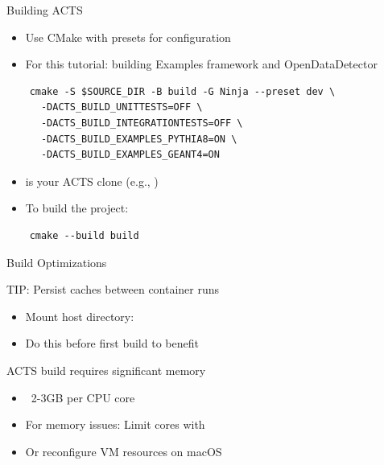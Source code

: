 \documentclass[lualatex,aspectratio=169,t,13pt,dvipsnames]{beamer}
\begin{document}
\begin{frame}[fragile]{Building ACTS}
  \begin{itemize}
    \item Use CMake with presets for configuration
    \item For this tutorial: building Examples framework and OpenDataDetector
  \end{itemize}
  
  \begin{verbatim}
    cmake -S $SOURCE_DIR -B build -G Ninja --preset dev \
      -DACTS_BUILD_UNITTESTS=OFF \
      -DACTS_BUILD_INTEGRATIONTESTS=OFF \
      -DACTS_BUILD_EXAMPLES_PYTHIA8=ON \
      -DACTS_BUILD_EXAMPLES_GEANT4=ON
  \end{verbatim}
  
  \begin{itemize}
    \item \cc{\$SOURCE\_DIR} is your ACTS clone (e.g., )
    \item To build the project:
  \end{itemize}
  
  \begin{verbatim}
    cmake --build build
  \end{verbatim}
\end{frame}

\begin{frame}{Build Optimizations}
  \begin{successblock}{ TIP: Persist  caches between container runs}
    \begin{itemize}
      \item Mount host directory: 
      \item Do this before first build to benefit
    \end{itemize}
  \end{successblock}
  \begin{warnblock}{\emoji{warning} ACTS build requires significant memory}
    \begin{itemize}
      \item ~2-3GB per CPU core
      \item For memory issues: Limit cores with 
      \item Or reconfigure VM resources on macOS
    \end{itemize}
  \end{warnblock}
\end{frame}
\end{document}
